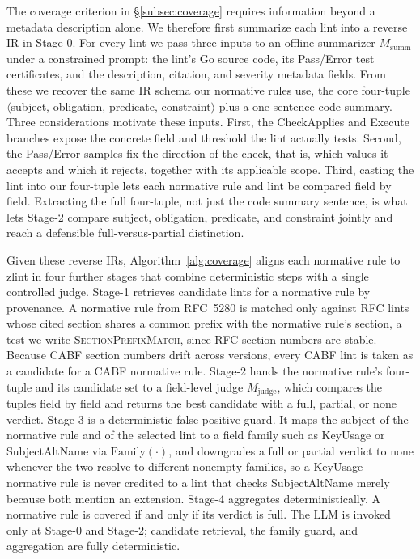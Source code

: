 The coverage criterion in \S\ref{subsec:coverage} requires information
beyond a metadata description alone. We therefore first summarize each lint into a reverse IR in Stage-0. For
every lint we pass three inputs to an offline summarizer
$M_{\mathrm{summ}}$ under a constrained prompt: the lint's Go source code, its
Pass/Error test certificates, and the description, citation, and severity
metadata fields. From these we recover the same IR schema our normative rules
use, the core four-tuple $\langle$subject, obligation, predicate, constraint$\rangle$
plus a one-sentence code summary. Three considerations motivate these inputs.
First, the CheckApplies and Execute branches expose the concrete field and
threshold the lint actually tests. Second, the Pass/Error samples fix the
direction of the check, that is, which values it accepts and which it rejects,
together with its applicable scope. Third, casting the lint into our four-tuple
lets each normative rule and lint be compared field by field. Extracting the
full four-tuple, not just the code summary sentence, is what lets Stage-2
compare subject, obligation, predicate, and constraint jointly and reach a
defensible full-versus-partial distinction.



Given these reverse IRs, Algorithm~\ref{alg:coverage} aligns each normative
rule to zlint in four further stages that combine deterministic steps with a
single controlled judge. Stage-1 retrieves candidate lints for a normative rule
by provenance. A normative rule from RFC~5280 is matched only against RFC lints
whose cited section shares a common prefix with the normative rule's section,
a test we write \textsc{SectionPrefixMatch}, since RFC section numbers are
stable. Because CABF section numbers drift across versions, every CABF lint is
taken as a candidate for a CABF normative rule. Stage-2 hands the normative
rule's four-tuple and its candidate set to a field-level judge $M_{\mathrm{judge}}$,
which compares the tuples field by field and returns the best candidate with a
full, partial, or none verdict. Stage-3 is a deterministic false-positive
guard. It maps the subject of the normative rule and of the selected lint to a
field family such as KeyUsage or SubjectAltName via $\mathrm{Family}(\cdot)$,
and downgrades a full or partial verdict to none whenever the two resolve to
different nonempty families, so a KeyUsage normative rule is never credited to
a lint that checks SubjectAltName merely because both mention an extension.
Stage-4 aggregates deterministically. A normative rule is covered if and only
if its verdict is full. The LLM is invoked only
at Stage-0 and Stage-2; candidate
retrieval, the family guard, and aggregation are fully deterministic.


